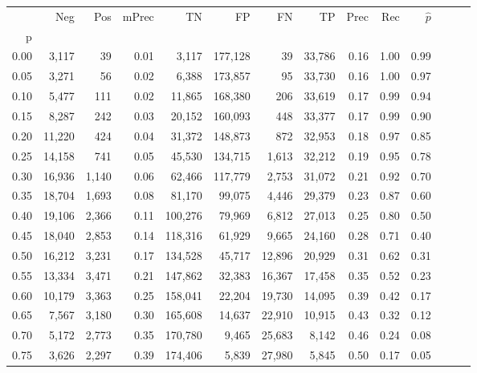 \begin{tabular}{rrrrrrrrrrrrrr}
\toprule
{} &     Neg &    Pos & mPrec &       TN &       FP &      FN &      TP &  Prec &   Rec & $\hat{p}$ \\
p    &         &        &       &          &          &         &         &       &       &           \\
\midrule
0.00 &   3,117 &     39 &  0.01 &    3,117 &  177,128 &      39 &  33,786 &  0.16 &  1.00 &      0.99 \\
0.05 &   3,271 &     56 &  0.02 &    6,388 &  173,857 &      95 &  33,730 &  0.16 &  1.00 &      0.97 \\
0.10 &   5,477 &    111 &  0.02 &   11,865 &  168,380 &     206 &  33,619 &  0.17 &  0.99 &      0.94 \\
0.15 &   8,287 &    242 &  0.03 &   20,152 &  160,093 &     448 &  33,377 &  0.17 &  0.99 &      0.90 \\
0.20 &  11,220 &    424 &  0.04 &   31,372 &  148,873 &     872 &  32,953 &  0.18 &  0.97 &      0.85 \\
0.25 &  14,158 &    741 &  0.05 &   45,530 &  134,715 &   1,613 &  32,212 &  0.19 &  0.95 &      0.78 \\
0.30 &  16,936 &  1,140 &  0.06 &   62,466 &  117,779 &   2,753 &  31,072 &  0.21 &  0.92 &      0.70 \\
0.35 &  18,704 &  1,693 &  0.08 &   81,170 &   99,075 &   4,446 &  29,379 &  0.23 &  0.87 &      0.60 \\
0.40 &  19,106 &  2,366 &  0.11 &  100,276 &   79,969 &   6,812 &  27,013 &  0.25 &  0.80 &      0.50 \\
0.45 &  18,040 &  2,853 &  0.14 &  118,316 &   61,929 &   9,665 &  24,160 &  0.28 &  0.71 &      0.40 \\
0.50 &  16,212 &  3,231 &  0.17 &  134,528 &   45,717 &  12,896 &  20,929 &  0.31 &  0.62 &      0.31 \\
0.55 &  13,334 &  3,471 &  0.21 &  147,862 &   32,383 &  16,367 &  17,458 &  0.35 &  0.52 &      0.23 \\
0.60 &  10,179 &  3,363 &  0.25 &  158,041 &   22,204 &  19,730 &  14,095 &  0.39 &  0.42 &      0.17 \\
0.65 &   7,567 &  3,180 &  0.30 &  165,608 &   14,637 &  22,910 &  10,915 &  0.43 &  0.32 &      0.12 \\
0.70 &   5,172 &  2,773 &  0.35 &  170,780 &    9,465 &  25,683 &   8,142 &  0.46 &  0.24 &      0.08 \\
0.75 &   3,626 &  2,297 &  0.39 &  174,406 &    5,839 &  27,980 &   5,845 &  0.50 &  0.17 &      0.05 \\

\end{tabular}

